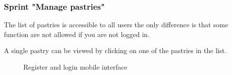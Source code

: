 \documentclass[12pt,a4paper]{report}
\begin{document}
\subsubsection*{Sprint "Manage pastries"}
The list of pastries is accessible to all users the only difference is that some function are not allowed if you are not logged in.\par 
A single pastry can be viewed by clicking on one of the pastries in the list.
\begin{figure}[H]
	\centering
	\vspace*{1in}
	\qquad
	\caption{Register and login mobile interface}%
	\label{managepastries-label}%
\end{figure}
\end{document}
